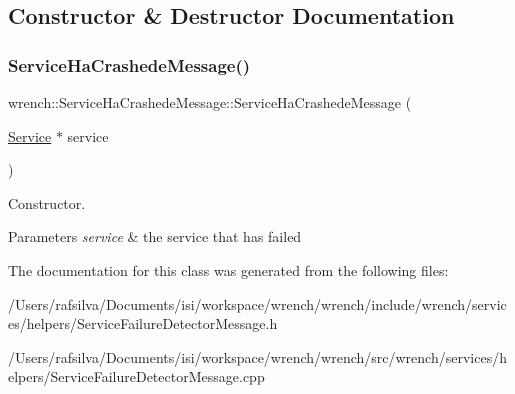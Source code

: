 \subsection{Constructor \& Destructor Documentation}
\mbox{\label{classwrench_1_1_service_ha_crashede_message_a88c03754a59f3b6df13f650e59c5d3f7}} 
\subsubsection{\texorpdfstring{Service\+Ha\+Crashede\+Message()}{ServiceHaCrashedeMessage()}}
{\footnotesize\ttfamily wrench\+::\+Service\+Ha\+Crashede\+Message\+::\+Service\+Ha\+Crashede\+Message (\begin{DoxyParamCaption}\item[{\hyperlink{classwrench_1_1_service}{Service} $\ast$}]{service }\end{DoxyParamCaption})}



Constructor. 


\begin{DoxyParams}{Parameters}
{\em service} & the service that has failed \\
\hline
\end{DoxyParams}


The documentation for this class was generated from the following files\+:\begin{DoxyCompactItemize}
\item 
/\+Users/rafsilva/\+Documents/isi/workspace/wrench/wrench/include/wrench/services/helpers/Service\+Failure\+Detector\+Message.\+h\item 
/\+Users/rafsilva/\+Documents/isi/workspace/wrench/wrench/src/wrench/services/helpers/Service\+Failure\+Detector\+Message.\+cpp\end{DoxyCompactItemize}
